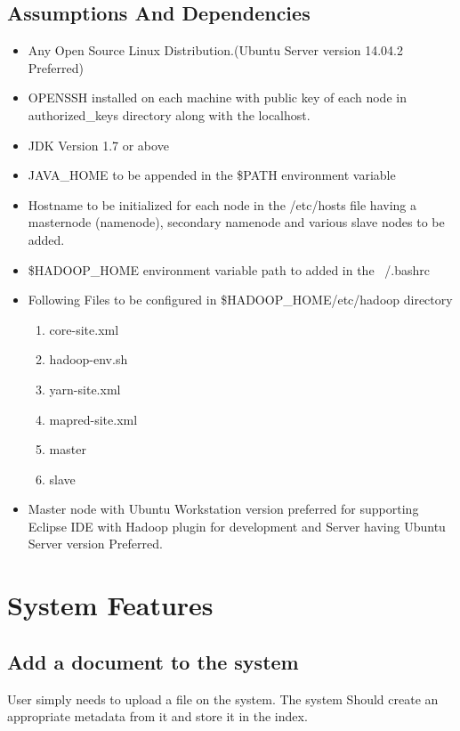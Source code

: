 \subsection{Assumptions And Dependencies}
\begin{itemize}
\item Any Open Source Linux Distribution.(Ubuntu Server version 14.04.2 Preferred)
\item OPENSSH installed on each machine with public key of each node in authorized\_keys directory along with the localhost.
\item JDK Version 1.7 or above
\item JAVA\_HOME to be appended in the \$PATH environment variable
\item Hostname to be initialized for each node in the /etc/hosts file having a masternode (namenode), secondary namenode and various slave nodes to be added.
\item \$HADOOP\_HOME environment variable path to added in the ~/.bashrc 
\item Following Files to be configured in \$HADOOP\_HOME/etc/hadoop directory

	\begin{enumerate}
	\item core-site.xml
	\item hadoop-env.sh
	\item yarn-site.xml
	\item mapred-site.xml
	\item master
	\item slave
	\end{enumerate}

\item Master node with Ubuntu Workstation version preferred for supporting Eclipse IDE with Hadoop plugin for development and Server having Ubuntu Server version Preferred.
\end{itemize}


\section{System Features}

\subsection{Add a document to the system}
User simply needs to upload a file on the system. The system
Should create an appropriate metadata from it and store it in the index.

